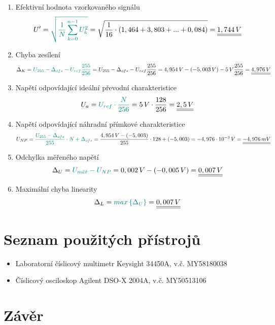 \documentclass[a4paper, czech]{article}
\begin{document}
\begin{enumerate}
    \item Efektivní hodnota vzorkovaného signálu
    \begin{multline*}
        U' = \textcolor{teal}{\sqrt{\frac{1}{N} \sum_{k=0}^{n-1} U_k^2}} = \sqrt{\frac{1}{16} \cdot \left( 1,464 + 3,803 + ... + 0,084 \right)} = \underline{\underline{1,744\,V}} \hfill
    \end{multline*}

    \item Chyba zesílení
    \begin{multline*}
        \Delta_K = \textcolor{teal}{U_{255} - \Delta_{ofs} - U_{ref} \frac{255}{256}} = U_{255} - \Delta_{ofs} - U_{ref} \frac{255}{256} = 4,954\,V - (-5,003\,V) - 5\,V \frac{255}{256} = \underline{\underline{4,976\,V}} \hfill
    \end{multline*}

    \item Napětí odpovídající ideální převodní charakteristice
    \begin{multline*}
        U_a = \textcolor{teal}{U_{ref} \cdot \frac{N}{256}} = 5\,V \cdot \frac{128}{256} = \underline{\underline{2,5\,V}} \hfill
    \end{multline*}

    \item Napětí odpovídající náhradní přímkové charakteristice
    \begin{multline*}
        U_{NP} = \textcolor{teal}{\frac{U_{255} - \Delta_{ofs}}{255} \cdot N + \Delta_{ofs}} = \frac{4,954\,V - (-5,003)}{255} \cdot 128 + (-5,003) = -4,976 \cdot 10^{-3}\,V = \underline{\underline{-4,976\,mV}} \hfill
    \end{multline*}

    \item Odchylka měřeného napětí
    \begin{multline*}
        \Delta_U = \textcolor{teal}{U_{m \check{e} \check{r}} - U_{NP}} = 0,002\,V - (-0,005\,V) = \underline{\underline{0,007\,V}} \hfill
    \end{multline*}

    \item Maximální chyba linearity
    \begin{multline*}
        \Delta_L = \textcolor{teal}{max \left\{\Delta_U\right\}} = \underline{\underline{0,007\,V}} \hfill
    \end{multline*}
\end{enumerate}

\section{Seznam použitých přístrojů}

\begin{itemize}
    \item Laboratorní číslicový multimetr Keysight 34450A, v.č. MY58180038
    \item Číslicový osciloskop Agilent DSO-X 2004A, v.č. MY50513106
\end{itemize}

\section{Závěr}
\end{document}
